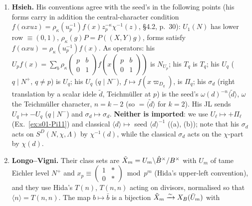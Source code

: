 \begin{lemma}
\begin{enumerate}[label=(\alph*)]
  $U_1(N)xU_1(N)\mapsto[V_1(N)x^{-\iota}V_1(N)]$, where $x^\iota=\bar x=\Nrd(x)x^{-1}$ and $[UyU]f=\sum_if(\cdot\,y_i^{-1})$ for $UyU=\coprod_iUy_i$. Then
  Hida's operator of $x$ on $S^*(N)$ is the seed's $T_{\bar x}$ on the same functions. Hence his $T(p)$ ($p\mid N$; $x=\mathrm{diag}(1,p)$) is
  $N_{U_p}$; his $T(\ell)$ ($\ell\nmid N$) is $T_\ell$; his $T(\ell,\ell)$ is $S_\ell$. In particular his $\langle\ell\rangle:=T(\ell,\ell)$ (weight $2$) is the seed's
  $S_\ell=\langle\ell\rangle^{-1}$ (Prop.~\ref{prop:s01-relations}(a) with $n=0$).
\item \textbf{Hsieh.} His conventions agree with the seed's in the following points (his forms carry in addition the central-character condition $f(\alpha xuz)=\rho_\kappa(u_p^{-1})f(x)z_p^{-\kappa}\chi^{-1}(z)$, \S4.2, p.~30): $U_1(N)$ has lower row $\equiv(0,1)$, $\rho_\kappa(g)P=P((X,Y)g)$, forms satisfy
  $f(\alpha xu)=\rho_\kappa(u_p^{-1})f(x)$. As operators: his $U_pf(x)=\sum_b\rho_\kappa\left(\begin{smallmatrix}p&b\\0&1\end{smallmatrix}\right)f\left(x\left(\begin{smallmatrix}p&b\\0&1\end{smallmatrix}\right)\right)$ is
  $N_{U_p}$; his $T_q$ is $T_q$; his $U_q$ ($q\mid N^+$, $q\ne p$) is $U_q$; his $U_q$ ($q\mid N^-$), $f\mapsto f(x\varpi_{D_q})$, is $\Pi_q$; his $\sigma_d$
  (right translation by a scalar idele $\tilde d$, Teichm\"uller at $p$) is the seed's $\omega(d)^{-n}\langle\tilde d\rangle$, $\omega$ the Teichm\"uller character, $n=k-2$ (so $=\langle\tilde d\rangle$ for $k=2$). His JL sends $U_q\mapsto-U_q$ ($q\mid N^-$)
  and $\sigma_d\mapsto\sigma_d$. \textbf{Neither is imported}: we use $U_\ell\mapsto+\Pi_\ell$ (Ex.~\ref{ex:s01-Pi11}) and classical
  $\langle d\rangle\mapsto$ seed $\langle d\rangle^{-1}$ ((a), (b)); note that his $\sigma_d$ acts on $S^D(N,\chi,\Lambda)$ by $\chi^{-1}(d)$, while the
  classical $\sigma_d$ acts on the $\chi$-part by $\chi(d)$.
\item \textbf{Longo--Vigni.} Their class sets are $\tilde X_m=U_m\backslash\hat{B}^\times/B^\times$ with $U_m$ of tame Eichler level $N^+$ and
  $x_p\equiv\left(\begin{smallmatrix}1&*\\0&*\end{smallmatrix}\right)\bmod p^m$ (Hida's upper-left convention), and they use Hida's $T(n)$, $T(n,n)$ acting on
  divisors, normalised so that $\langle n\rangle=T(n,n)$. The map $b\mapsto\bar b$ is a bijection $\tilde X_m\xrightarrow\sim X_B(\bar U_m)$ with

\end{enumerate}
\end{lemma}
